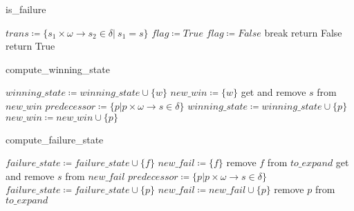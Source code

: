 \documentclass[10pt]{article}
\begin{document}
\begin{algorithm}[h]
\Large
\caption{is\_failure}
\label{algo:is_fail}
$trans\coloneqq\{s_1\times\omega\to s_2\in\delta|\ s_1=s\}$\;
{
    $flag\coloneqq True$\;
    {
        {
            $flag\coloneqq False$\;
            break\;
        }
    }
    {
        return False\;
    }
}
return True\;
\end{algorithm}

\begin{algorithm}[h]
\Large
\caption{compute\_winning\_state}
\label{algo:comput_win}
$winning\_state\coloneqq winning\_state\cup\{w\}$\;
$new\_win\coloneqq \{w\}$\;
{
    get and remove $s$ from $new\_win$\;
    $predecessor\coloneqq\{p|p\times\omega\to s\in \delta\}$\;
    {
        {
            $winning\_state\coloneqq winning\_state\cup\{p\}$\;
            $new\_win\coloneqq new\_win\cup\{p\}$\;
        }
    }
}
\end{algorithm}

\begin{algorithm}[h]
\Large
\caption{compute\_failure\_state}
\label{algo:comput_fail}
$failure\_state\coloneqq failure\_state\cup\{f\}$\;
$new\_fail\coloneqq \{f\}$\;
remove $f$ from $to\_expand$\;
{
    get and remove $s$ from $new\_fail$\;
    $predecessor\coloneqq\{p|p\times\omega\to s\in \delta\}$\;
    {
        {
            $failure\_state\coloneqq failure\_state\cup\{p\}$\;
            $new\_fail\coloneqq new\_fail\cup\{p\}$\;
            remove $p$ from $to\_expand$\;
        }
    }
}
\end{algorithm}
\end{document}
